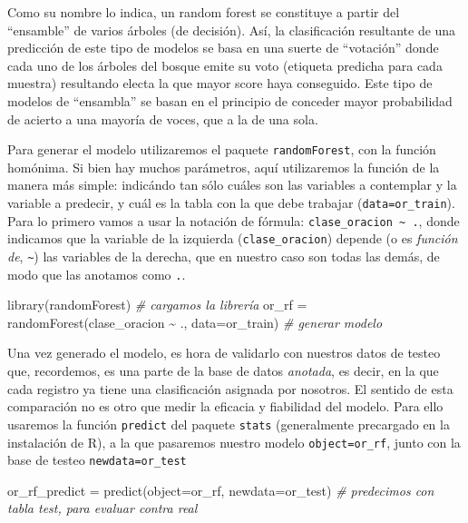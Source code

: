 \documentclass[
]{book}
\newenvironment{Shaded}{\begin{snugshade}}{\end{snugshade}}
\newcommand{\AttributeTok}[1]{\textcolor[rgb]{0.77,0.63,0.00}{#1}}
\newcommand{\CommentTok}[1]{\textcolor[rgb]{0.56,0.35,0.01}{\textit{#1}}}
\newcommand{\FunctionTok}[1]{\textcolor[rgb]{0.00,0.00,0.00}{#1}}
\newcommand{\NormalTok}[1]{#1}
\newcommand{\OtherTok}[1]{\textcolor[rgb]{0.56,0.35,0.01}{#1}}
\newcommand{\SpecialCharTok}[1]{\textcolor[rgb]{0.00,0.00,0.00}{#1}}
\begin{document}
Como su nombre lo indica, un random forest se constituye a partir del ``ensamble'' de varios árboles (de decisión). Así, la clasificación resultante de una predicción de este tipo de modelos se basa en una suerte de ``votación'' donde cada uno de los árboles del bosque emite su voto (etiqueta predicha para cada muestra) resultando electa la que mayor score haya conseguido. Este tipo de modelos de ``ensambla'' se basan en el principio de conceder mayor probabilidad de acierto a una mayoría de voces, que a la de una sola.

Para generar el modelo utilizaremos el paquete \texttt{randomForest}, con la función homónima. Si bien hay muchos parámetros, aquí utilizaremos la función de la manera más simple: indicándo tan sólo cuáles son las variables a contemplar y la variable a predecir, y cuál es la tabla con la que debe trabajar (\texttt{data=or\_train}). Para lo primero vamos a usar la notación de fórmula: \texttt{clase\_oracion\ \textasciitilde{}\ .}, donde indicamos que la variable de la izquierda (\texttt{clase\_oracion}) depende (o es \emph{función de}, \texttt{\textasciitilde{}}) las variables de la derecha, que en nuestro caso son todas las demás, de modo que las anotamos como \texttt{.}.

\begin{Shaded}
\begin{Highlighting}[]
\FunctionTok{library}\NormalTok{(randomForest) }\CommentTok{\# cargamos la librería}
\NormalTok{or\_rf }\OtherTok{=} \FunctionTok{randomForest}\NormalTok{(clase\_oracion }\SpecialCharTok{\textasciitilde{}}\NormalTok{ ., }\AttributeTok{data=}\NormalTok{or\_train) }\CommentTok{\# generar modelo}
\end{Highlighting}
\end{Shaded}

Una vez generado el modelo, es hora de validarlo con nuestros datos de testeo que, recordemos, es una parte de la base de datos \emph{anotada}, es decir, en la que cada registro ya tiene una clasificación asignada por nosotros. El sentido de esta comparación no es otro que medir la eficacia y fiabilidad del modelo. Para ello usaremos la función \texttt{predict} del paquete \texttt{stats} (generalmente precargado en la instalación de R), a la que pasaremos nuestro modelo \texttt{object=or\_rf}, junto con la base de testeo \texttt{newdata=or\_test}

\begin{Shaded}
\begin{Highlighting}[]
\NormalTok{or\_rf\_predict }\OtherTok{=} \FunctionTok{predict}\NormalTok{(}\AttributeTok{object=}\NormalTok{or\_rf, }\AttributeTok{newdata=}\NormalTok{or\_test) }\CommentTok{\# predecimos con tabla test, para evaluar contra real}
\end{Highlighting}
\end{Shaded}
\end{document}
